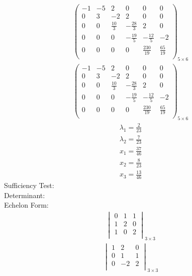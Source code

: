 \documentclass{article}
\begin{document}
\begin{align*}
\left(
\begin{array}{ccccc|c}
-1 & -5 & 2 & 0 & 0 & 0\\
0 & 3 & -2 & 2 & 0 & 0\\
0 & 0 & \frac{10}{3} & -\frac{28}{3} & 2 & 0\\
0 & 0 & 0 & -\frac{19}{5} & -\frac{12}{5} & -2\\
0 & 0 & 0 & 0 & \frac{230}{19} & \frac{65}{19}\\
\end{array}
\right)_{5\times 6}
\end{align*}
\begin{align*}
\left(
\begin{array}{ccccc|c}
-1 & -5 & 2 & 0 & 0 & 0\\
0 & 3 & -2 & 2 & 0 & 0\\
0 & 0 & \frac{10}{3} & -\frac{28}{3} & 2 & 0\\
0 & 0 & 0 & -\frac{19}{5} & -\frac{12}{5} & -2\\
0 & 0 & 0 & 0 & \frac{230}{19} & \frac{65}{19}\\
\end{array}
\right)_{5\times 6}
\end{align*}
\begin{align*}
\lambda_{1}=\frac{2}{23}\end{align*}
\begin{align*}
\lambda_{2}=\frac{7}{23}\end{align*}
\begin{align*}
x_{1}=\frac{37}{46}\end{align*}
\begin{align*}
x_{2}=\frac{8}{23}\end{align*}
\begin{align*}
x_{3}=\frac{13}{46}\end{align*}
Sufficiency Test:\\
Determinant:\\
Echelon Form:\\
\begin{align*}
\begin{vmatrix}
0 & 1 & 1\\
1 & 2 & 0\\
1 & 0 & 2\\
\end{vmatrix}_{3\times 3}
\end{align*}
\begin{align*}
\begin{vmatrix}
1 & 2 & 0\\
0 & 1 & 1\\
0 & -2 & 2\\
\end{vmatrix}_{3\times 3}
\end{align*}
\end{document}
